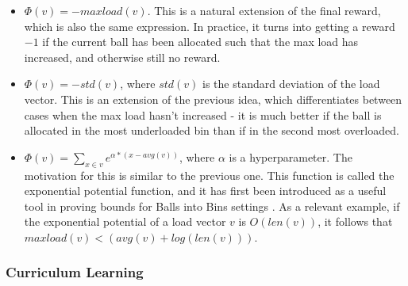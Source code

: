 \begin{itemize}
    \item
    $\Phi(v)=-maxload(v)$. This is a natural extension of the final reward, which is also the same expression. In practice, it turns into getting a reward $-1$ if the current ball has been allocated such that the max load has increased, and otherwise still no reward.
    \item
    $\Phi(v)=-std(v)$, where $std(v)$ is the standard deviation of the load vector. This is an extension of the previous idea, which differentiates between cases when the max load hasn't increased - it is much better if the ball is allocated in the most underloaded bin than if in the second most overloaded.
    \item
    $\Phi(v)=\sum_{x\in v} e^{\alpha * (x - avg(v))}$, where $\alpha$ is a hyperparameter. The motivation for this is similar to the previous one. This function is called the exponential potential function, and it has first been introduced as a useful tool in proving bounds for Balls into Bins settings \cite{ghosh1999exponentialpotential} . As a relevant example, if the exponential potential of a load vector $v$ is $O(len(v))$, it follows that $maxload(v) < (avg(v)+log(len(v)))$.
\end{itemize}


\subsubsection{Curriculum Learning}



